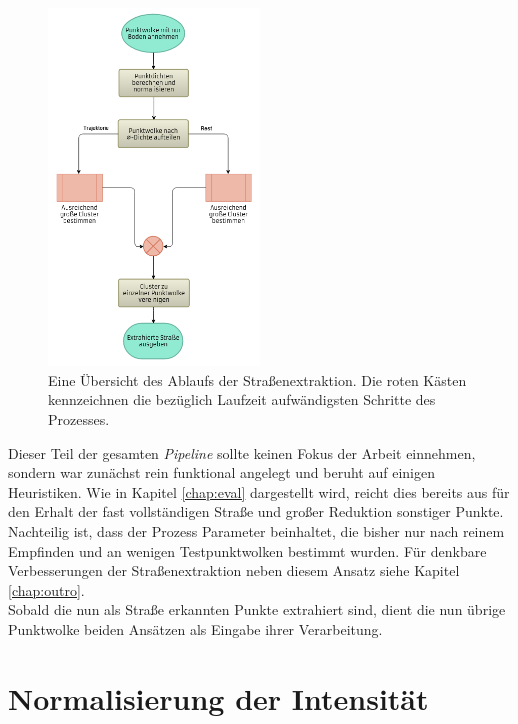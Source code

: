 \begin{figure}[!ht]
    \centering
    \includegraphics[width=0.5\textwidth]{graphics/flowchart_street_extraction}
    \caption{Eine Übersicht des Ablaufs der Straßenextraktion. Die roten Kästen kennzeichnen die bezüglich Laufzeit aufwändigsten Schritte des Prozesses.}
    \label{fig:street_extraction}
\end{figure}

Dieser Teil der gesamten \textit{Pipeline} sollte keinen Fokus der Arbeit einnehmen, sondern war zunächst rein funktional angelegt und beruht auf einigen Heuristiken. Wie in Kapitel \ref{chap:eval} dargestellt wird, reicht dies bereits aus für den Erhalt der fast vollständigen Straße und großer Reduktion sonstiger Punkte. Nachteilig ist, dass der Prozess Parameter beinhaltet, die bisher nur nach reinem Empfinden und an wenigen Testpunktwolken bestimmt wurden. Für denkbare Verbesserungen der Straßenextraktion neben diesem Ansatz siehe Kapitel \ref{chap:outro}. \\
Sobald die nun als Straße erkannten Punkte extrahiert sind, dient die nun übrige Punktwolke beiden Ansätzen als Eingabe ihrer Verarbeitung.

\section{Normalisierung der Intensität}

